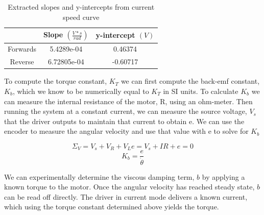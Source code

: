 \documentclass{article}
\theoremstyle{plain}
\theoremstyle{definition}
\theoremstyle{remark}
\begin{document}
\begin{table}
\begin{center}
    \begin{tabular}{|c|c|c|}
        \hline
        ~        & Slope $\left( \frac{V * s}{rad} \right) $ & y-intercept $ \left( V \right) $ \\ \hline
        Forwards & 5.4289e-04                                & 0.46374                          \\ 
        Reverse  & 6.72805e-04                               & -0.60717                         \\
        \hline
    \end{tabular}
\end{center}
\caption{Extracted slopes and y-intercepts from current speed curve}
\label{q2_b5}
\end{table}

To compute the torque constant, $K_{T}$ we can first compute the back-emf constant, $K_b$, which we know to be numerically equal to $K_T$ in SI units.  To calculate $K_b$ we can measure the internal resistance of the motor, R, using an ohm-meter.  Then running the system at a constant current, we can measure the source voltage, $V_{s}$ that the driver outputs to maintain that current  to obtain e. We can use the encoder to measure the angular velocity and use that value with e to solve for $K_b$

$$ \Sigma_{V} = V_{s} + V_{R} + V_{L} e = V_{s} + IR + e = 0 $$
$$ K_b = \frac{e}{\dot{\theta}} $$

%
%

We can experimentally determine the viscous damping term, $b$ by applying a known torque to the motor.  Once the angular velocity has reached steady state, $b$ can be read off directly.  The driver in current mode delivers a known current, which using the torque constant determined above yields the torque.  
\end{document}

